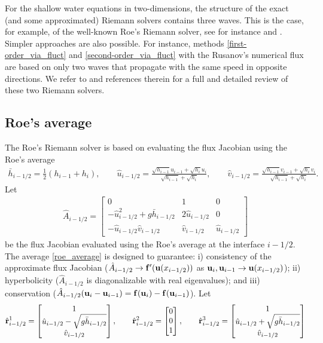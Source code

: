 \documentclass[preprint, 11pt]{article}
\newcommand{\bff}{{\bf f}}
\newcommand{\bfr}{{\bf r}}
\newcommand{\bfu}{{\bf u}}
\begin{document}
For the shallow water equations in two-dimensions, the structure of the exact (and some 
approximated) Riemann solvers contains three waves. This is the case, for example, of the well-known 
Roe's Riemann solver, see for instance \cite{roe1981approximate} and 
\cite[\S 15.3.3 and \S 21.7]{leveque2002finite}. 
Simpler approaches are also possible. 
For instance, methods \eqref{first-order_via_fluct} and \eqref{second-order_via_fluct}
with the Rusanov's numerical flux are based on only two waves that 
propagate with the same speed in opposite directions.
We refer to \cite{ketcheson2020riemann} and references therein for 
a full and detailed review of these two Riemann solvers. 

\subsection{Roe's average}\label{sec:roe}
The Roe's Riemann solver is based on evaluating the flux Jacobian using the Roe's average
\begin{align}\label{roe_average}
  \bar h_{i-1/2}=\frac{1}{2}(h_{i-1}+h_i), \qquad 
  \hat u_{i-1/2}=\frac{\sqrt{h_{i-1}}u_{i-1}+\sqrt{h_i}u_i}{\sqrt{h_{i-1}}+\sqrt{h_i}}, \qquad
  \hat v_{i-1/2}=\frac{\sqrt{h_{i-1}}v_{i-1}+\sqrt{h_i}v_i}{\sqrt{h_{i-1}}+\sqrt{h_i}}.
\end{align}
Let 
\begin{align*}
\hat A_{i-1/2} =
\begin{bmatrix}
  0 & 1 & 0 \\
  -\hat u_{i-1/2}^2+g\bar h_{i-1/2} & 2\hat u_{i-1/2} & 0 \\
  -\hat u_{i-1/2} \hat v_{i-1/2} & \hat v_{i-1/2} & \hat u_{i-1/2}
\end{bmatrix}
\end{align*}
be the flux Jacobian evaluated using the Roe's average at the interface $i-1/2$.
The average \eqref{roe_average} is designed to guarantee: 
i)  consistency of the approximate flux Jacobian 
($\hat A_{i-1/2}\rightarrow \bff^\prime(\bfu(x_{i-1/2}))$ as $\bfu_i, \bfu_{i-1}\rightarrow \bfu(x_{i-1/2})$); 
ii) hyperbolicity ($\hat A_{i-1/2}$ is diagonalizable with real eigenvalues);
and iii) conservation ($\hat A_{i-1/2}(\bfu_i-\bfu_{i-1})=\bff(\bfu_i)-\bff(\bfu_{i-1})$). 
Let
\begin{align*}
  \hat \bfr^1_{i-1/2} = 
  \begin{bmatrix}
    1 \\ 
    \hat u_{i-1/2}-\sqrt{g\bar h_{i-1/2}}\\
    \hat v_{i-1/2}
  \end{bmatrix},
  \qquad 
  \hat \bfr^2_{i-1/2} = 
  \begin{bmatrix}
    0\\ 
    0\\ 
    1
  \end{bmatrix},
  \qquad
  \hat \bfr^3_{i-1/2} = 
  \begin{bmatrix}
    1 \\ 
    \hat u_{i-1/2}+\sqrt{g\bar h_{i-1/2}}\\
    \hat v_{i-1/2}
  \end{bmatrix}
\end{align*}
\end{document}
